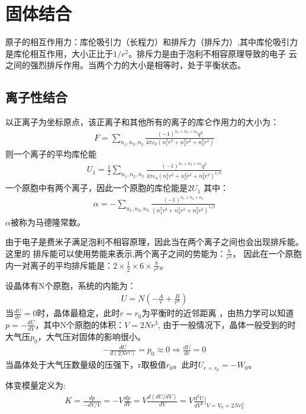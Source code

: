 \documentclass[UTF8]{article}
\numberwithin{equation}{section}
\begin{document}
\newpage
\section{固体结合}
原子的相互作用力：库伦吸引力（长程力）和排斥力（排斥力）,其中库伦吸引力
是库伦相互作用，大小正比于$1/r^2$。排斥力是由于泡利不相容原理导致的电子
云之间的强烈排斥作用。当两个力的大小是相等时，处于平衡状态。
\subsection{离子性结合}
以正离子为坐标原点，该正离子和其他所有的离子的库仑作用力的大小为：
\begin{align*}
    F = \sum_{n_1,n_2,n_3}\frac{(-1)^{n_1+n_2+n_3}q^2}{4\pi \varepsilon_0(n_1^2r^2+n_2^2r^2+n_3^2r^2)}
\end{align*}
则一个离子的平均库伦能
\begin{align*}
    U_1 = \frac{1}{2} \sum_{n_1,n_2,n_3}\frac{(-1)^{n_1+n_2+n_3}q^2}{4\pi \varepsilon_0(n_1^2r^2+n_2^2r^2+n_3^2r^2)^{1/2}}
\end{align*}
一个原胞中有两个离子，因此一个原胞的库伦能是$2U_1$
其中：
\begin{align*}
    \alpha =- \sum_{n_1,n_2,n_3}\frac{(-1)^{n_1+n_2+n_3}}{(n_1^2r^2+n_2^2r^2+n_3^2r^2)^{1/2}}
\end{align*}
$\alpha$被称为马德隆常数。

由于电子是费米子满足泡利不相容原理，因此当在两个离子之间也会出现排斥能。这里的
排斥能可以使用势能来表示,两个离子之间的势能为：$\frac{b}{r^n}$，
因此在一个原胞内一对离子的平均排斥能是：$2\times\frac{1}{2}\times 6
    \times \frac{b}{r^n}$。

设晶体有N个原胞，系统的内能为：
\begin{align*}
    U = N(-\frac{A}{r}+\frac{B}{r^n})
\end{align*}
当$\frac{d U}{dr}=0$时，晶体最稳定，此时$r=r_0$为平衡时的近邻距离
，由热力学可以知道$p = -\frac{dU}{dV}$，其中N个原胞的体积：$V=2Nr^3$,
由于一般情况下，晶体一般受到的时大气压$p_0$，大气压对固体的影响很小。
\begin{align*}
    -\frac{dU}{d(2Nr^3)}=p_0\approx 0\Rightarrow \frac{d U}{dr}=0
\end{align*}
当晶体处于大气压数量级的压强下，r取极值$r_0$。此时$U_{r=r_0}=-W_0$。

体变模量定义为:
\begin{align*}
    K=\frac{dp}{-dV/V}=-V\frac{dp}{dV}=V\frac{d(dU/dV)}{dV}=V\frac{d^2U}{dV^2}|_{V=V_0=2Nr_0^3}
\end{align*}
\end{document}
